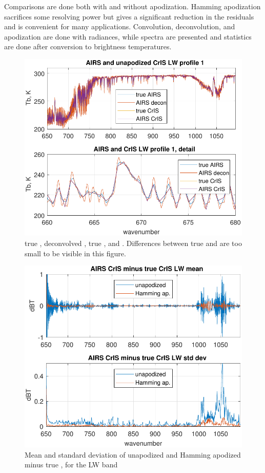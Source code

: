 \documentclass[journal]{IEEEtran}
\begin{document}
Comparisons are done both with and without apodization.  Hamming
apodization \cite{barn2000, wiki:wind} sacrifices some resolving
power but gives a significant reduction in the residuals and is
convenient for many applications.  Convolution, deconvolution, and
apodization are done with radiances, while spectra are presented and
statistics are done after conversion to brightness temperatures.

\begin{figure} %
  \centering
  \includegraphics[width=\linewidth]{figures/a2cris_spec_LW.pdf}
  \caption{true {\airs}, deconvolved {\airs}, true {\cris}, and {\airs}
    {\cris}.  Differences between true {\cris} and {\airs} {\cris} are too
    small to be visible in this figure.}
  \label{specLW}
\end{figure}

\begin{figure} %
  \centering
  \includegraphics[width=\linewidth]{figures/a2cris_diff_LW.pdf}
  \caption{Mean and standard deviation of unapodized and Hamming
    apodized {\airs} {\cris} minus true {\cris}, for the {\cris} LW
    band}
  \label{diffLW}
\end{figure}
\end{document}
